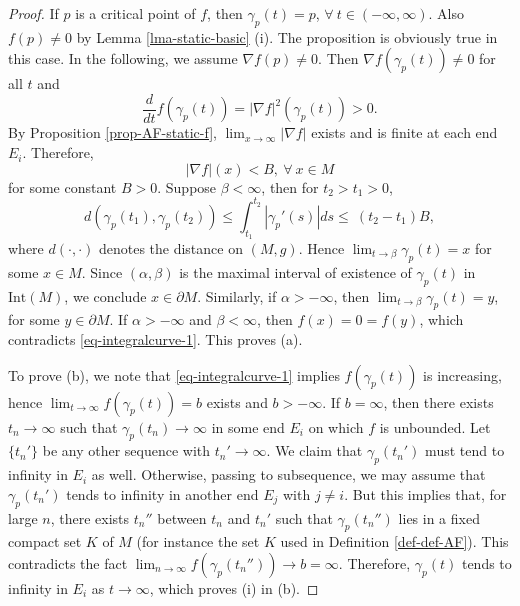 \documentclass[12pt]{amsart}
\theoremstyle{remark}
\numberwithin{equation}{section}
\newcommand{\be}{\begin{equation}}
\newcommand{\ee}{\end{equation}}
\newcommand{\bee}{\begin{equation*}}
\newcommand{\eee}{\end{equation*}}
\def\p{\partial}
\def\Int{\text{Int}}
\def\a{\alpha}
\begin{document}
\begin{proof}
If $p$ is a critical point of $f$, then $\gamma_p(t)=p$, $\forall \  t \in (-\infty,\infty)$.
Also  $f(p)\neq0$ by Lemma \ref{lma-static-basic} (i).
The proposition is obviously true in this case.
In the following, we assume $ \nabla f (p) \neq 0$.
Then   $\nabla f(\gamma_p(t))\neq 0$ for all $t$ and
\be\label{eq-integralcurve-1}
\frac{d }{dt}f(\gamma_p (t))=|\nabla f|^2(\gamma_p (t))>0.
\ee
By Proposition \ref{prop-AF-static-f}, $ \lim_{x \rightarrow \infty} | \nabla f |$ exists and is finite at each end $E_i$.
Therefore,
\be\label{eq-integralcurve-2}
 | \nabla f | (x) < B, \ \forall \ x \in M
\ee
for some  constant  $B >0 $.  Suppose $\beta<\infty$, then for $t_2> t_1>0$,
\bee
d(\gamma_p (t_1),\gamma_p (t_2))  \le  \int_{t_1}^{t_2}|\gamma_p'(s)|ds
\le   \ (t_2-t_1) B,
\eee
where $ d (\cdot, \cdot)$ denotes the distance on $(M, g)$.
Hence $\lim_{t\to\beta}\gamma_p (t)= x$ for some $x \in  M$.
Since $(\a,\beta)$ is the maximal interval of existence of $\gamma_p(t)$ in $\Int(M)$,
we conclude $x\in \p M$.  Similarly, if $\a>-\infty$, then $\lim_{t\to\beta}\gamma_p(t)=y$, for some $y\in \p M$.
If $\a>-\infty$ and $\beta<\infty$, then $f(x)=0=f(y)$, which contradicts \eqref{eq-integralcurve-1}. This proves  (a).

To prove (b), we note that  \eqref{eq-integralcurve-1} implies  $f(\gamma_p(t))$ is increasing, hence
 $\lim_{t\to\infty}f(\gamma_p (t)) = b $ exists and $ b > - \infty$.
If  $b=\infty$, then
there exists  $t_n\to\infty$ such that $\gamma_p(t_n)\to\infty$ in some end $E_i$ on which $f$ is unbounded.
Let $\{ t_n' \} $ be any other sequence with $ t_n' \to \infty$.
We claim that $\gamma_p (t_n')$ must  tend to infinity in $E_i$ as well.
Otherwise, passing to subsequence, we may assume that $\gamma_p (t_n')$ tends to infinity in another end $E_j$ with $ j \neq i$.
But this implies that, for large $n$,  there exists $t_n'' $ between $t_n$ and $t_n'$ such that $ \gamma_p (t_n'')$ lies in a fixed compact set  $K$ of $M$
(for instance the set $K$ used in Definition \ref{def-def-AF}). This  contradicts  the fact $ \lim_{n \rightarrow \infty} f (\gamma_p ( t_n'')) \to b = \infty$.
Therefore, $ \gamma_p (t)$ tends to infinity in $E_i$ as $ t \rightarrow \infty$, which  proves (i) in (b).


\end{proof}
\end{document}
